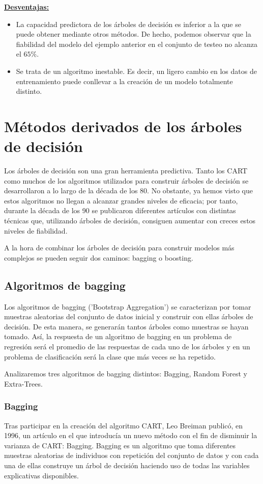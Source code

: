 \documentclass[12pt,twoside]{article}
\begin{document}
\textbf{\underline{Desventajas:}}
\begin{itemize}
\item La capacidad predictora de los árboles de decisión es inferior a la que se puede obtener mediante otros métodos. De hecho, podemos observar que la fiabilidad del modelo del ejemplo anterior en el conjunto de testeo no alcanza el $65\%$.
\item Se trata de un algoritmo inestable. Es decir, un ligero cambio en los datos de entrenamiento puede conllevar a la creación de un modelo totalmente distinto. %
\end{itemize}



\newpage
\section{Métodos derivados de los árboles de decisión}
Los árboles de decisión son una gran herramienta predictiva. Tanto los CART como muchos de los algoritmos utilizados para construir árboles de decisión se desarrollaron a lo largo de la década de los 80. No obstante, ya hemos visto que estos algoritmos no llegan a alcanzar grandes niveles de eficacia; por tanto, durante la década de los 90 se publicaron diferentes artículos con distintas técnicas que, utilizando árboles de decisión, consiguen aumentar con creces estos niveles de fiabilidad.

A la hora de combinar los árboles de decisión para construir modelos más complejos se pueden seguir dos caminos: bagging o boosting.


\subsection{Algoritmos de bagging}
Los algoritmos de bagging ('Bootstrap Aggregation') se caracterizan por tomar muestras aleatorias del conjunto de datos inicial y construir con ellas árboles de decisión. De esta manera, se generarán tantos árboles como muestras se hayan tomado. Así, la respuesta de un algoritmo de bagging en un problema de regresión será el promedio de las respuestas de cada uno de los árboles y en un problema de clasificación será la clase que más veces se ha repetido.

Analizaremos tres algoritmos de bagging distintos: Bagging, Random Forest y Extra-Trees.


\subsubsection{Bagging}
Tras participar en la creación del algoritmo CART, Leo Breiman publicó, en 1996, un artículo en el que introducía un nuevo método con el fin de disminuir la varianza de CART: Bagging. Bagging es un algoritmo que toma diferentes muestras aleatorias de individuos con repetición del conjunto de datos y con cada una de ellas construye un árbol de decisión haciendo uso de todas las variables explicativas disponibles.
\end{document}
